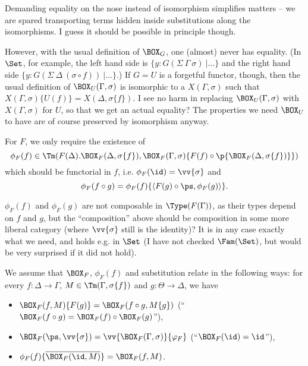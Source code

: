 \documentclass{article}
\newcommand{\isoFL}{\ensuremath{\phi_{F}}} %
\begin{document}
\begin{remark}
  Demanding equality on the nose instead of isomorphism simplifies
  matters -- we are spared transporting terms hidden inside
  substitutions along the isomorphisms. I guess it should be possible
  in principle though.

  However, with the usual definition of $\BOX_G$, one (almost)
  never has equality. (In $\Set$, for example, the left hand side is
  $\{ y : G(\Sigma\ \Gamma\ \sigma)\ |\ldots\}$ and the right hand
  side $\{ y : G(\Sigma\ \Delta\ (\sigma \circ f))\ |\ldots\}$.)  If
  $G = U$ is a forgetful functor, though, then the usual definition of
  $\BOX_U(\Gamma, \sigma)$ is isomorphic to a $X(\Gamma, \sigma)$
  such that $X(\Gamma, \sigma)\{U(f)\} = X(\Delta, \sigma\{f\})$. I
  see no harm in replacing $\BOX_U(\Gamma, \sigma)$ with $X(\Gamma,
  \sigma)$ for $U$, so that we get an actual equality? The properties
  we need $\BOX_U$ to have are of course preserved by isomorphism
  anyway.
\end{remark}
%
For $F$, we only require the existence of
\[
\isoFL(f) \in \Tm(F(\Delta).\BOX_F(\Delta, \sigma\{f\}),
\BOX_F(\Gamma, \sigma)\{F(f) \circ \p{\BOX_F(\Delta,
  \sigma\{f\})}\})
\]
which should be functorial in $f$, i.e. $\isoFL(\id) = \vv{\sigma}$
and 
\[
\isoFL(f \circ g) = \isoFL(f)\{\langle F(g) \circ \ps, \isoFL(g)\rangle\}.
\]

\begin{remark}
  $\isoFL(f)$ and $\isoFL(g)$ are not composable in
  $\Type(F(\Gamma))$, as their types depend on $f$ and $g$, but the
  ``composition'' above should be composition in some more liberal
  category (where $\vv{\sigma}$ still is the identity)? It is in any
  case exactly what we need, and holds e.g. in $\Set$ (I
  have not checked $\Fam(\Set)$, but would be very surprised if it did
  not hold).
\end{remark}

We assume that $\BOX_F$, $\isoFL(f)$ and substitution relate in the
following ways: for every $f : \Delta \to \Gamma$, $M \in \Tm(\Gamma,
\sigma\{f\})$ and $g : \Theta \to \Delta$, we have
\begin{itemize}
\item $\BOX_F(f, M)\{F(g)\} = \BOX_F(f \circ g, M\{g\})$  \quad(``$\BOX_F(f \circ g) = \BOX_F(f) \circ \BOX_F(g)$''),
\item $\BOX_F(\ps, \vv{\sigma}) = \vv{\BOX_F(\Gamma, \sigma)}\{\varphi_F\}$ \quad\qquad\qquad(``$\BOX_F(\id) = \id$''),
\item $\isoFL(f)\{\overline{\BOX_F(\id, M)}\} = \BOX_F(f, M)$.
\end{itemize}
\end{document}
